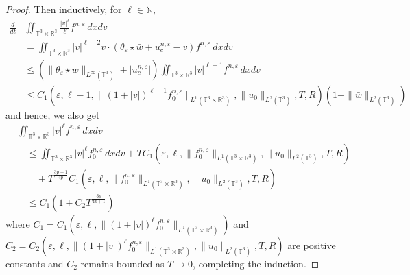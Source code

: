 \documentclass[10pt,reqno]{amsart}
\numberwithin{equation}{section}
\newcommand{\R}{\mathbb R}
\newcommand{\N}{\mathbb N}
\newcommand{\T}{\mathbb T}
\newcommand{\e}{\varepsilon}
\newcommand{\lt}{\left}
\newcommand{\rt}{\right}
\newcommand{\inttr}{\iint_{\T^3 \times \R^3}}
\begin{document}
\begin{proof}
Then inductively, for $\ell \in \N$,
\[\begin{aligned}
\frac{d}{dt}& \inttr \frac{|v|^\ell}{\ell} f^{n,\e}\,dxdv \\
&= \inttr |v|^{\ell-2}v \cdot (\theta_\e \star \bar w + u_c^{n,\e} - v) f^{n,\e}\,dxdv\\
&\le \lt(\|\theta_\e \star \bar w\|_{L^\infty(\T^3)} + |u_c^{n,\e}| \rt) \inttr |v|^{\ell-1}f^{n,\e}\,dxdv\\
&\le C_1(\e, \ell-1, \|(1+|v|)^{\ell-1}f_0^{n,\e}\|_{L^1(\T^3\times\R^3)}, \|u_0\|_{L^2(\T^3)}, T, R)(1+\|\bar w\|_{L^2(\T^3)})
\end{aligned}\]
and hence, we also get
\[\begin{aligned}
&\inttr |v|^\ell f^{n,\e}\,dxdv \\
&\quad\le \inttr |v|^\ell f_0^{n,\e}\,dxdv+ TC_1(\e, \ell, \|f_0^{n,\e}\|_{L^1(\T^3\times\R^3)}, \|u_0\|_{L^2(\T^3)}, T, R)\\
&\qquad + T^{\frac{3p+1}{4p}}C_1(\e, \ell, \|f_0^{n,\e}\|_{L^1(\T^3\times\R^3)}, \|u_0\|_{L^2(\T^3)}, T, R)\\
&\quad\le C_1 (1+ C_2 T^{\frac{3p}{4p+1}})
\end{aligned}\]
where $C_1= C_1(\e, \ell, \|(1+|v|)^\ell f_0^{n,\e}\|_{L^1(\T^3\times\R^3)})$ and $C_2 = C_2(\e, \ell, \|(1+|v|)^\ell f_0^{n,\e}\|_{L^1(\T^3\times\R^3)}, \|u_0\|_{L^2(\T^3)}, T, R)$ are positive constants and $C_2$ remains bounded as $T \to 0$, completing the induction.



\end{proof}
\end{document}
